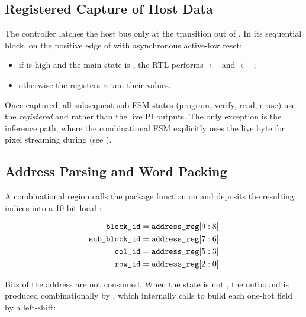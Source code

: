 \subsection{Registered Capture of Host Data}
\label{sec:rtl-controller-capture}

The controller latches the host bus only at the transition out of
. In its sequential block, on the positive edge of
 with asynchronous active-low reset:

\begin{itemize}
    \item if  is high and the main state is
          , the RTL performs
           \(\leftarrow\)  and
           \(\leftarrow\) ;
    \item otherwise the registers retain their values.
\end{itemize}

Once captured, all subsequent sub-FSM states (program, verify, read,
erase) use the \emph{registered}  and
 rather than the live PI outputs. The only exception
is the inference path, where the combinational FSM explicitly uses the
live  byte for pixel streaming during
 (see ).

\subsection{Address Parsing and Word Packing}
\label{sec:rtl-controller-addr}

A combinational region calls the package function
 on  and deposits the
resulting indices into a 10-bit local :

\begin{align*}
    \texttt{block\_id}     &= \texttt{address\_reg}[9:8] \\
    \texttt{sub\_block\_id} &= \texttt{address\_reg}[7:6] \\
    \texttt{col\_id}       &= \texttt{address\_reg}[5:3] \\
    \texttt{row\_id}       &= \texttt{address\_reg}[2:0]
\end{align*}

Bits \sv{[15:10]} of the address are not consumed. When the state is
not , the outbound  is produced
combinationally by
, which internally calls
 to build each one-hot field by a
left-shift:

